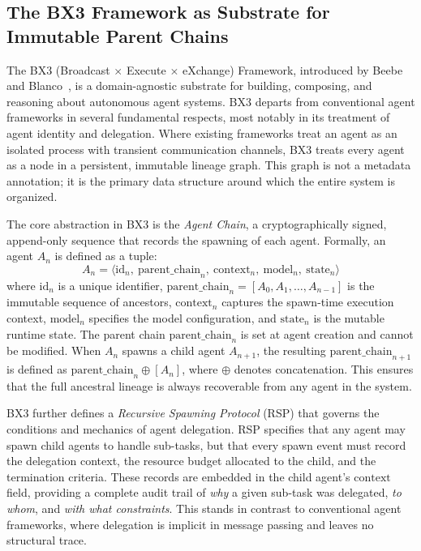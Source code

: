 \subsection{The BX3 Framework as Substrate for Immutable Parent Chains}

The BX3 (Broadcast $\times$ Execute $\times$ eXchange) Framework, introduced by Beebe and Blanco~\cite{beebe2025bx3}, is a domain-agnostic substrate for building, composing, and reasoning about autonomous agent systems. BX3 departs from conventional agent frameworks in several fundamental respects, most notably in its treatment of agent identity and delegation. Where existing frameworks treat an agent as an isolated process with transient communication channels, BX3 treats every agent as a node in a persistent, immutable lineage graph. This graph is not a metadata annotation; it is the primary data structure around which the entire system is organized.

The core abstraction in BX3 is the \emph{Agent Chain}, a cryptographically signed, append-only sequence that records the spawning of each agent. Formally, an agent $A_n$ is defined as a tuple:
\begin{equation}
A_n = \langle \text{id}_n,\ \text{parent\_chain}_n,\ \text{context}_n,\ \text{model}_n,\ \text{state}_n \rangle
\end{equation}
where $\text{id}_n$ is a unique identifier, $\text{parent\_chain}_n = [A_0, A_1, \dots, A_{n-1}]$ is the immutable sequence of ancestors, $\text{context}_n$ captures the spawn-time execution context, $\text{model}_n$ specifies the model configuration, and $\text{state}_n$ is the mutable runtime state. The parent chain $\text{parent\_chain}_n$ is set at agent creation and cannot be modified. When $A_n$ spawns a child agent $A_{n+1}$, the resulting $\text{parent\_chain}_{n+1}$ is defined as $\text{parent\_chain}_n \oplus [A_n]$, where $\oplus$ denotes concatenation. This ensures that the full ancestral lineage is always recoverable from any agent in the system.

BX3 further defines a \emph{Recursive Spawning Protocol} (RSP) that governs the conditions and mechanics of agent delegation. RSP specifies that any agent may spawn child agents to handle sub-tasks, but that every spawn event must record the delegation context, the resource budget allocated to the child, and the termination criteria. These records are embedded in the child agent's $\text{context}$ field, providing a complete audit trail of \emph{why} a given sub-task was delegated, \emph{to whom}, and \emph{with what constraints}. This stands in contrast to conventional agent frameworks, where delegation is implicit in message passing and leaves no structural trace.

